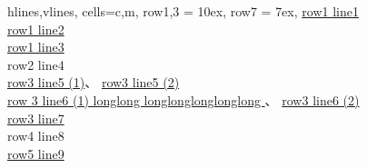 \documentclass[a4paper,12pt]{ctexrep}
\begin{document}
\begin{table}
	\centering
	\begin{tblr}[
			tall,
			note{$\dag$} = {Comment for tblr.},
		]{
			hlines,vlines,
			cells={c,m},
			row{1,3} = {10ex},
			row{7} = {7ex},
		}
		{%
			\href{127.0.0.1}{row1 line1} \\
			\href{127.0.0.1}{row1 line2} \\
			\href{127.0.0.1}{row1 line3}%
		}      \\
		{row2 line4}\TblrNote{$\dag$}                 \\
		{%
			\href{127.0.0.1}{row3 line5 (1)}、%
			\href{127.0.0.1}{row3 line5 (2)} \\
			\href{127.0.0.1}{%
				row 3 line6 (1) longlong%
				longlonglonglonglong%
			}、%
			\href{127.0.0.1}{row3 line6 (2)} \\
			\href{127.0.0.1}{%
				row3 line7}%
		} \\
		{row4 line8}                                  \\
		{%
			{%
				\href{127.0.0.1}{row5 line9}%
			}
		}    \\
	\end{tblr}
\end{table}
\end{document}
